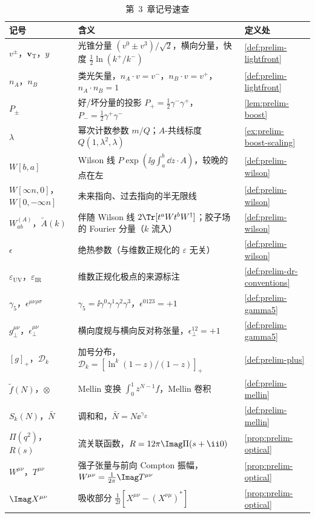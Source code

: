 \begin{table}[htbp]
\centering
\caption{第~3~章记号速查}\label{tab:prelim-symbols}
\footnotesize
\renewcommand{\arraystretch}{1.05}
\begin{tabularx}{\textwidth}{@{}l X l@{}}
\toprule
记号 & 含义 & 定义处 \\
\midrule
$v^\pm$，$\mathbf v_{\mathrm T}$，$y$ & 光锥分量 $(v^0\pm v^3)/\sqrt2$，横向分量，快度 $\frac12\ln(k^+/k^-)$ & \cref{def:prelim-lightfront} \\
$n_A$，$n_B$ & 类光矢量，$n_A\cdot v=v^-$，$n_B\cdot v=v^+$，$n_A\cdot n_B=1$ & \cref{def:prelim-lightfront} \\
$P_\pm$ & 好/坏分量的投影 $P_+=\frac12\gamma^-\gamma^+$，$P_-=\frac12\gamma^+\gamma^-$ & \cref{lem:prelim-boost} \\
$\lambda$ & 幂次计数参数 $m/Q$；$A$-共线标度 $Q(1,\lambda^2,\lambda)$ & \cref{ex:prelim-boost-scaling} \\
$W[b,a]$ & Wilson 线 $P\exp(\ii g\int_a^b\dd z\cdot A)$，较晚的点在左 & \cref{def:prelim-wilson} \\
$W[\infty n,0]$，$W[0,-\infty n]$ & 未来指向、过去指向的半无限线 & \cref{def:prelim-wilson} \\
$W^{(A)}_{ab}$，$\tilde A(k)$ & 伴随 Wilson 线 $2\Tr[t^aWt^bW^\dagger]$；胶子场的 Fourier 分量（$k$ 流入） & \cref{def:prelim-wilson} \\
$\epsilon$ & 绝热参数（与维数正规化的 $\varepsilon$ 无关） & \cref{def:prelim-wilson} \\
$\varepsilon_{\mathrm{UV}}$，$\varepsilon_{\mathrm{IR}}$ & 维数正规化极点的来源标注 & \cref{def:prelim-dr-conventions} \\
$\gamma_5$，$\epsilon^{\mu\nu\rho\sigma}$ & $\gamma_5=\ii\gamma^0\gamma^1\gamma^2\gamma^3$，$\epsilon^{0123}=+1$ & \cref{def:prelim-gamma5} \\
$g_\perp^{\mu\nu}$，$\epsilon_\perp^{\mu\nu}$ & 横向度规与横向反对称张量，$\epsilon_\perp^{12}=+1$ & \cref{def:prelim-gamma5} \\
$[g]_+$，$\mathcal D_k$ & 加号分布，$\mathcal D_k=[\ln^k(1-z)/(1-z)]_+$ & \cref{def:prelim-plus} \\
$\tilde f(N)$，$\otimes$ & Mellin 变换 $\int_0^1z^{N-1}f$，Mellin 卷积 & \cref{def:prelim-mellin} \\
$S_k(N)$，$\bar N$ & 调和和，$\bar N=N\ee^{\gamma_E}$ & \cref{def:prelim-mellin} \\
$\Pi(q^2)$，$R(s)$ & 流关联函数，$R=12\pi\Imag\Pi(s+\ii0)$ & \cref{prop:prelim-optical} \\
$W^{\mu\nu}$，$T^{\mu\nu}$ & 强子张量与前向 Compton 振幅，$W^{\mu\nu}=\frac1{2\pi}\Imag T^{\mu\nu}$ & \cref{prop:prelim-optical} \\
$\Imag X^{\mu\nu}$ & 吸收部分 $\frac1{2\ii}[X^{\mu\nu}-(X^{\nu\mu})^*]$ & \cref{prop:prelim-optical} \\
\bottomrule
\end{tabularx}
\end{table}
